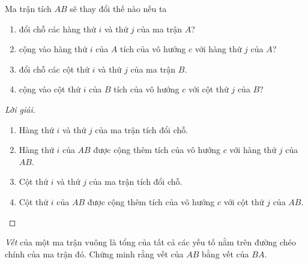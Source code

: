 \documentclass[class=nhvh-linear-algebra,crop=false]{standalone}
\begin{document}
\begin{exercise}
    Ma trận tích $AB$ sẽ thay đổi thế nào nếu ta
    \begin{enumerate}[label = (\alph*)]
        \item đổi chỗ các hàng thứ $i$ và thứ $j$ của ma trận $A$?
        \item cộng vào hàng thứ $i$ của $A$ tích của vô hướng $c$ với hàng thứ $j$ của $A$?
        \item đổi chỗ các cột thứ $i$ và thứ $j$ của ma trận $B$.
        \item cộng vào cột thứ $i$ của $B$ tích của vô hướng $c$ với cột thứ $j$ của $B$?
    \end{enumerate}
\end{exercise}

\begin{proof}[Lời giải]
    \begin{enumerate}[label = (\alph*)]
        \item Hàng thứ $i$ và thứ $j$ của ma trận tích đổi chỗ.
        \item Hàng thứ $i$ của $AB$ được cộng thêm tích của vô hướng $c$ với hàng thứ $j$ của $AB$.
        \item Cột thứ $i$ và thứ $j$ của ma trận tích đổi chỗ.
        \item Cột thứ $i$ của $AB$ được cộng thêm tích của vô hướng $c$ với cột thứ $j$ của $AB$.
    \end{enumerate}
\end{proof}

\begin{exercise}\label{trace-of-products}
    \textit{Vết} của một ma trận vuông là tổng của tất cả các yếu tố nằm trên đường chéo chính của ma trận đó. Chứng minh rằng vết của $AB$ bằng vết của $BA$.
\end{exercise}
\end{document}
